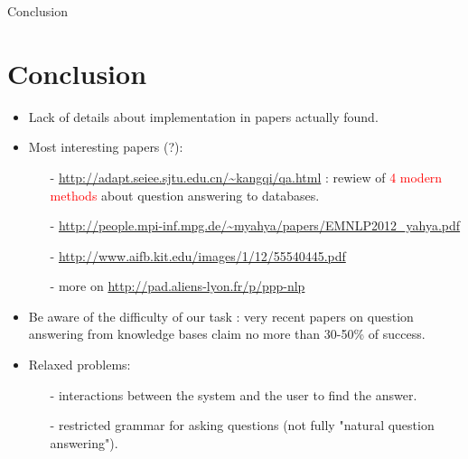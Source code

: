 \documentclass[10pt]{beamer}
\begin{document}

\begin{frame}{Conclusion}

\section{Conclusion}

\begin{itemize}
	\item Lack of details about implementation in papers actually found.
	\item Most interesting papers (?):
		\begin{itemize}
			\item[-] \url{http://adapt.seiee.sjtu.edu.cn/~kangqi/qa.html} : rewiew of \textcolor{red}{4 modern methods} about question answering to databases. 
			\item[-] \url{http://people.mpi-inf.mpg.de/~myahya/papers/EMNLP2012_yahya.pdf}
			\item[-] \url{http://www.aifb.kit.edu/images/1/12/55540445.pdf}
			\item[-] more on \url{http://pad.aliens-lyon.fr/p/ppp-nlp}
		\end{itemize}
	\item	Be aware of the difficulty of our task : very recent papers on question answering from knowledge bases claim no more than 30-50\% of success.
	\item Relaxed problems:
		\begin{itemize}
			\item[-] interactions between the system and the user to find the answer.
			\item[-] restricted grammar for asking questions (not fully "natural question answering").
		\end{itemize}
\end{itemize}


\end{frame}

\end{document}
